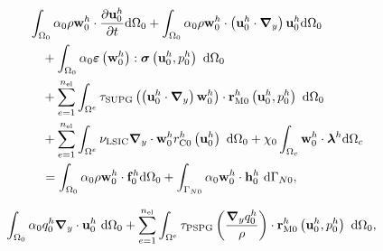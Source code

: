 \begin{align}
	\begin{split}
		&\int_{\globalModel} \arlequinWFGlobal \density \wglobalh \cdot \frac{\partial\uglobalh}{\partial t} \deriv \globalModel +
		\int_{\globalModel} \arlequinWFGlobal \density \wglobalh \cdot  \left(\uglobalh \cdot \gradient \right) \uglobalh \deriv \globalModel  \\ 
		&\quad+	
		\int_{\globalModel} \arlequinWFGlobal \straintensor \left(\wglobalh\right) : \stressTensor \left(\uglobalh,\pglobalh\right)\ \deriv \globalModel \\
		&\quad+ \sum_{e=1}^{\nel} \int_{\domainE} \SUPG  \left(\left(\uglobalh \cdot \gradient \right) \wglobalh\right) \cdot \resMomGlobal\left(\uglobalh,\pglobalh \right)\  \deriv \globalModel \\ 
		&\quad+\sum_{e=1}^{\nel} \int_{\domainE} \LSIC \divergence \cdot \wglobalh \resPreGlobal 
		\left(\uglobalh\right)\  \deriv \globalModel 
		+ \chi_{0} \int_{\gluingZone} \wglobalh \cdot \lagrangeMultiplierh \deriv \gluingZone   \\ 
		&\quad = \int_{\globalModel} \arlequinWFGlobal \density \wglobalh \cdot  \globalsbodyforceh \deriv \globalModel + \int_{\globalBoundaryN} \arlequinWFGlobal \wglobalh  \cdot \globalSurfaceLoadh\ \deriv \globalBoundaryN,
		\label{eq:QM_forma_fraca_0_atu}
	\end{split}
\end{align}

\begin{align}
	\begin{split}
		&	\int_{\Omega_0} \alpha_0 q_0^h \boldsymbol{\nabla}_y \cdot \mathbf{u}_0^h \ \mathrm{d} \Omega_0 +
		\sum_{e=1}^{n_{\mathrm{el}}} \int_{\Omega^e} \tau_{\mathrm{PSPG}} \left(\frac{\boldsymbol{\nabla}_y q_0^h}{\rho}\right) \cdot \mathbf{r}_{\mathrm{M0}}^{h}\left(\mathbf{u}_0^h,p_0^h\right) \  \mathrm{d} \Omega_0,
		\label{eq:C_forma_fraca_0_atu}
	\end{split}
\end{align}

